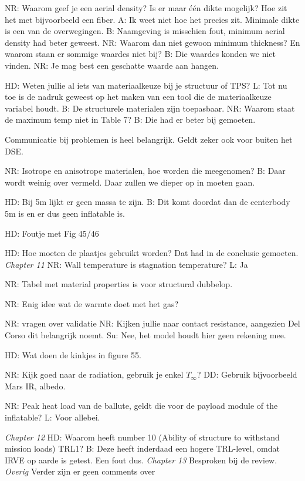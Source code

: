 NR: Waarom geef je een aerial density? Is er maar één dikte mogelijk? Hoe zit het met bijvoorbeeld een fiber.
A: Ik weet niet hoe het precies zit. Minimale dikte is een van de overwegingen.
B: Naamgeving is misschien fout, minimum aerial density had beter geweest.
NR: Waarom dan niet gewoon minimum thickness? En waarom staan er sommige waardes niet bij?
B: Die waardes konden we niet vinden.
NR: Je mag best een geschatte waarde aan hangen.

HD: Weten jullie al iets van materiaalkeuze bij je structuur of TPS?
L: Tot nu toe is de nadruk geweest op het maken van een tool die de materiaalkeuze variabel houdt. 
B: De structurele materialen zijn toepasbaar.
NR: Waarom staat de maximum temp niet in Table 7?
B: Die had er beter bij gemoeten.

Communicatie bij problemen is heel belangrijk. Geldt zeker ook voor buiten het DSE.

NR: Isotrope en anisotrope materialen, hoe worden die meegenomen?
B: Daar wordt weinig over vermeld. Daar zullen we dieper op in moeten gaan.

HD: Bij 5m lijkt er geen massa te zijn.
B: Dit komt doordat dan de centerbody 5m is en er dus geen inflatable is.

HD: Foutje met Fig 45/46

HD: Hoe moeten de plaatjes gebruikt worden? Dat had in de conclusie gemoeten.
\newline\newline
\textit{Chapter 11}\newline
NR: Wall temperature is stagnation temperature?
L: Ja

NR: Tabel met material properties is voor structural dubbelop.

NR: Enig idee wat de warmte doet met het gas?

NR: vragen over validatie
NR: Kijken jullie naar contact resistance, aangezien Del Corso dit belangrijk noemt.
Su: Nee, het model houdt hier geen rekening mee.

HD: Wat doen de kinkjes in figure 55.

NR: Kijk goed naar de radiation, gebruik je enkel $T_\infty$?
DD: Gebruik bijvoorbeeld Mars IR, albedo.

NR: Peak heat load van de ballute, geldt die voor de payload module of the inflatable?
L: Voor allebei.

\newline\newline
\textit{Chapter 12}\newline
HD: Waarom heeft number 10 (Ability of structure to withstand mission loads) TRL1?
B: Deze heeft inderdaad een hogere TRL-level, omdat IRVE op aarde is getest. Een fout dus.
\newline\newline
\textit{Chapter 13}\newline
Besproken bij de review.
\newline\newline
\textit{Overig}\newline
Verder zijn er geen comments over 
